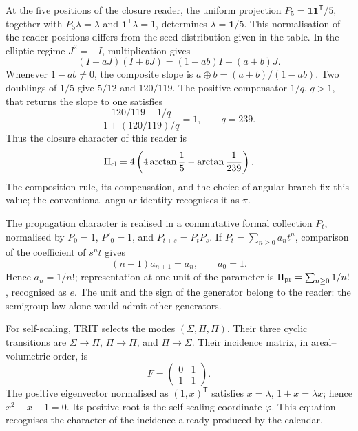 At the five positions of the closure reader, the uniform projection
\(P_5=\mathbf1\mathbf1^{\mathsf T}/5\), together with
\(P_5\lambda=\lambda\) and \(\mathbf1^{\mathsf T}\lambda=1\), determines
\(\lambda=\mathbf1/5\). This normalisation of the reader positions
differs from the seed distribution given in the table.
In the elliptic regime \(J^2=-I\), multiplication gives
\[
(I+aJ)(I+bJ)=(1-ab)I+(a+b)J.
\]
Whenever \(1-ab\ne0\), the composite slope is
\(a\oplus b=(a+b)/(1-ab)\). Two doublings of \(1/5\) give
\(5/12\) and \(120/119\). The positive compensator \(1/q\), \(q>1\),
that returns the slope to one satisfies
\[
\frac{120/119-1/q}{1+(120/119)/q}=1,
\qquad q=239.
\]
Thus the closure character of this reader is
\begin{equation}
 \Pi_{\rm cl}=4\left(4\arctan\frac15-\arctan\frac1{239}\right).
 \label{vi:dep:lector-clausura}
\end{equation}
The composition rule, its compensation, and the choice of angular branch
fix this value; the conventional angular identity recognises it as \(\pi\).

The propagation character is realised in a commutative formal collection
\(P_t\), normalised by \(P_0=1\), \(P'_0=1\), and
\(P_{t+s}=P_tP_s\). If \(P_t=\sum_{n\ge0}a_nt^n\), comparison
of the coefficient of \(s^nt\) gives
\[
 (n+1)a_{n+1}=a_n,\qquad a_0=1.
\]
Hence \(a_n=1/n!\); representation at one unit of the parameter is
\(\Pi_{\rm pr}=\sum_{n\ge0}1/n!\), recognised as \(e\).
The unit and the sign of the generator belong to the reader: the semigroup
law alone would admit other generators.

For self-scaling, TRIT selects the modes
\((\Sigma,\Pi,\Pi)\). Their three cyclic transitions are
\(\Sigma\to\Pi\), \(\Pi\to\Pi\), and \(\Pi\to\Sigma\). Their incidence
matrix, in areal--volumetric order, is
\begin{equation}
 F=\begin{pmatrix}0&1\\1&1\end{pmatrix}.
 \label{vi:dep:incidencia-hojas}
\end{equation}
The positive eigenvector normalised as \((1,x)^{\mathsf T}\)
satisfies \(x=\lambda\), \(1+x=\lambda x\); hence
\(x^2-x-1=0\). Its positive root is the self-scaling coordinate
\(\varphi\). This equation recognises the character of the incidence already
produced by the calendar.

